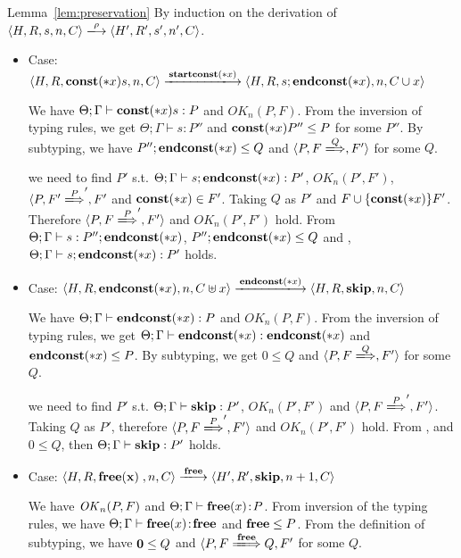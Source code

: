 \begin{pfof}{Lemma~\ref{lem:preservation}}
By induction on the derivation of \(\langle H,R,s,n, C \rangle
\xlongrightarrow{\rho} \langle H',R',s', n', C \rangle\).

\begin{itemize}

\item Case: \( \langle H, R, \scon\Sirx s, n, C \rangle
  \xlongrightarrow{\Startconst} \langle H, R, s;\Endconst, n, C\cup
  {x} \rangle \)

  We have \( \Theta; \Gamma \vdash \mathbf{const}(*x) s:P\) and \( OK_n(P, F)
  \). From the inversion of typing rules, we get \( \Theta; \Gamma
  \vdash s:P'' \) and \( \mathbf{const}(*x) P'' \le P \) for some \( P''
  \). By subtyping, we have \( P'';\mathbf{endconst}(*x) \le Q \) and \( \langle P, F 
  \xLongrightarrow Q, F' \rangle \) for some \( Q \).

  we need to find \(P'\) s.t. \( \Theta; \Gamma \vdash
  s;\mathbf{endconst}(*x):P'\), \( OK_n(P', F')\), \( \langle P, F'
  \xLongrightarrow P', F' \) and \(\mathbf{const}(*x)\in F'\). Taking \( Q \)
  as \( P'\) and \( F \cup \{\mathbf{const}(*x)\} F' \). Therefore \( \langle
  P, F \xLongrightarrow P', F' \rangle\) and \( OK_n(P', F')\) hold. From \(
  \Theta; \Gamma \vdash s:P'';\mathbf{endconst}(*x) \), \( P'';\mathbf{endconst}(*x) \le Q \)
  and , \( \Theta; \Gamma \vdash s;\mathbf{endconst}(*x):P'\) holds.

\item Case: \( \langle H, R, \Endconst, n, C \uplus {x} \rangle
  \xlongrightarrow{\Endconst} \langle H, R, \SKIP, n, C \rangle \)

  We have \( \Theta; \Gamma \vdash \mathbf{endconst}(*x):P\) and \( OK_n(P, F)
  \). From the inversion of typing rules, we get \( \Theta; \Gamma
  \vdash \mathbf{endconst}(*x):\mathbf{endconst}(*x) \) and \( \mathbf{endconst}(*x) \le P \). By
  subtyping, we get \( 0 \le Q \) and \( \langle P, F
  \xLongrightarrow Q, F' \rangle\) for some \( Q \).

  we need to find \(P'\) s.t. \( \Theta; \Gamma \vdash
  \mathbf{skip}:P'\), \( OK_n(P', F')\) and \( \langle P, F \xLongrightarrow
  P', F' \rangle \). Taking \( Q \) as \( P'\), therefore \( \langle
  P, F \xLongrightarrow P', F' \rangle\) and \( OK_n(P', F')\)
  hold. From ,  and \( 0 \le Q\), then \( \Theta;
  \Gamma \vdash \mathbf{skip}:P'\) holds.

\item Case: \(\langle H, R, \FREE, n, C\rangle \xlongrightarrow{\Free}
  \langle H', R', \SKIP, n + 1, C \rangle \)

   We have \(\mathit{OK}_n(P, F)\) and \(\Theta; \Gamma \vdash \mathbf{free}(x) \!:\!
   P\).  From inversion of the typing rules, we have \(\Theta; \Gamma
   \vdash \mathbf{free}(x) \!:\! \mathbf{free}\) and \(\mathbf{free} \le P\). From the
   definition of subtyping, we have \(\mathbf{0} \le Q \) and \( \langle
   P, F \xLongrightarrow{\Free} Q, F'\) for some \(Q\).


\end{itemize}
\end{pfof}
